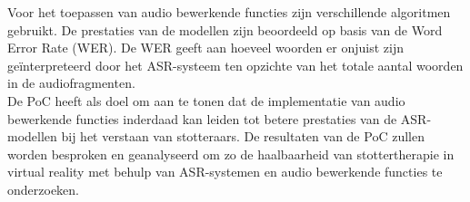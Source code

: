 Voor het toepassen van audio bewerkende functies zijn verschillende algoritmen gebruikt. De prestaties van de modellen zijn beoordeeld op basis van de Word Error Rate (WER). De WER geeft aan hoeveel woorden er onjuist zijn geïnterpreteerd door het ASR-systeem ten opzichte van het totale aantal woorden in de audiofragmenten.\\

De PoC heeft als doel om aan te tonen dat de implementatie van audio bewerkende functies inderdaad kan leiden tot betere prestaties van de ASR-modellen bij het verstaan van stotteraars. De resultaten van de PoC zullen worden besproken en geanalyseerd om zo de haalbaarheid van stottertherapie in virtual reality met behulp van ASR-systemen en audio bewerkende functies te onderzoeken.



